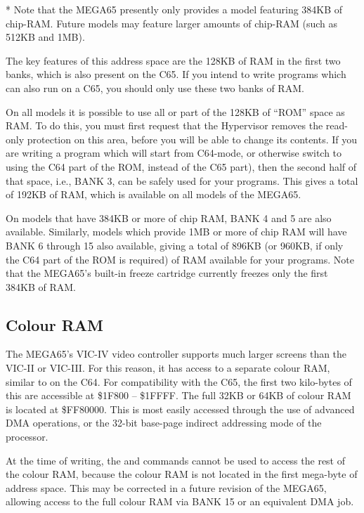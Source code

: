 * Note that the MEGA65 presently only provides a model featuring 384KB of chip-RAM. Future models may feature larger amounts of chip-RAM (such as 512KB and 1MB).

The key features of this address space are the 128KB of RAM in the first two banks, which is also present on
the C65. If you intend to write programs which can also run on a C65, you should only use these two banks
of RAM.

On all models it is possible to use all or part of the 128KB of ``ROM'' space as RAM. To do this, you must first
request that the Hypervisor removes the read-only protection on this area, before you will be able to change
its contents.  If you are writing a program which will start from C64-mode, or otherwise switch to using the C64
part of the ROM, instead of the C65 part), then the second half of that space, i.e., BANK 3, can be safely used
for your programs. This gives a total of 192KB of RAM, which is available on all models of the MEGA65.

On models that have 384KB or more of chip RAM, BANK 4 and 5 are also available.  Similarly, models which provide
1MB or more of chip RAM will have BANK 6 through 15 also available, giving a total of 896KB (or 960KB, if only
the C64 part of the ROM is required) of RAM available for your programs.  Note that the MEGA65's built-in
freeze cartridge currently freezes only the first 384KB of RAM.

\subsection{Colour RAM}

The MEGA65's VIC-IV video controller supports much larger screens than the VIC-II or VIC-III. For this reason, it
has access to a separate colour RAM, similar to on the C64.  For compatibility with the C65, the first two kilo-bytes
of this are accessible at \$1F800 -- \$1FFFF.  The full 32KB or 64KB of colour RAM is located at \$FF80000.
This is most easily accessed through the use of advanced DMA operations, or the 32-bit base-page indirect addressing
mode of the processor.

At the time of writing, the  and  commands cannot be used to access the rest of the colour RAM, because the
colour RAM is not located in the first mega-byte of address space.  This may be corrected in a future revision of
the MEGA65, allowing access to the full colour RAM via BANK 15 or an equivalent DMA job.

